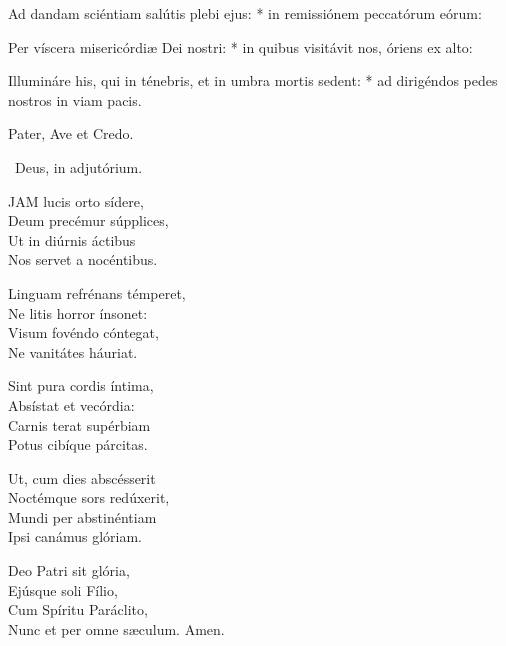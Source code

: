 Ad dandam sciéntiam salútis plebi ejus: * in remissiónem peccatórum eórum:

Per víscera misericórdiæ Dei nostri: * in quibus visitávit nos, óriens ex alto:

Illumináre his, qui in ténebris, et in umbra mortis sedent: * ad dirigéndos pedes nostros in viam pacis.




Pater, Ave et Credo.

\V\ Deus, in adjutórium.


\lettrine[lines=2]{J}{AM} lucis orto sídere,\\
Deum precémur súpplices,\\
Ut in diúrnis áctibus\\
Nos servet a nocéntibus.

Linguam refrénans témperet,\\
Ne litis horror ínsonet:\\
Visum fovéndo cóntegat,\\
Ne vanitátes háuriat.

Sint pura cordis íntima,\\
Absístat et vecórdia:\\
Carnis terat supérbiam\\
Potus cibíque párcitas.

Ut, cum dies abscésserit\\
Noctémque sors redúxerit,\\
Mundi per abstinéntiam\\
Ipsi canámus glóriam.

Deo Patri sit glória,\\
Ejúsque soli Fílio,\\
Cum Spíritu Paráclito,\\
Nunc et per omne sæculum. Amen.

